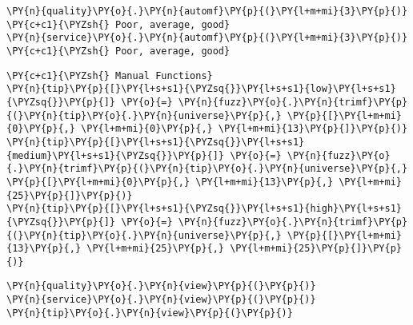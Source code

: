     \begin{tcolorbox}[breakable, size=fbox, boxrule=1pt, pad at break*=1mm,colback=cellbackground, colframe=cellborder]
\begin{Verbatim}[commandchars=\\\{\}]
\PY{n}{quality}\PY{o}{.}\PY{n}{automf}\PY{p}{(}\PY{l+m+mi}{3}\PY{p}{)} \PY{c+c1}{\PYZsh{} Poor, average, good}
\PY{n}{service}\PY{o}{.}\PY{n}{automf}\PY{p}{(}\PY{l+m+mi}{3}\PY{p}{)} \PY{c+c1}{\PYZsh{} Poor, average, good}
\end{Verbatim}
\end{tcolorbox}

    \begin{tcolorbox}[breakable, size=fbox, boxrule=1pt, pad at break*=1mm,colback=cellbackground, colframe=cellborder]
\begin{Verbatim}[commandchars=\\\{\}]
\PY{c+c1}{\PYZsh{} Manual Functions}
\PY{n}{tip}\PY{p}{[}\PY{l+s+s1}{\PYZsq{}}\PY{l+s+s1}{low}\PY{l+s+s1}{\PYZsq{}}\PY{p}{]} \PY{o}{=} \PY{n}{fuzz}\PY{o}{.}\PY{n}{trimf}\PY{p}{(}\PY{n}{tip}\PY{o}{.}\PY{n}{universe}\PY{p}{,} \PY{p}{[}\PY{l+m+mi}{0}\PY{p}{,} \PY{l+m+mi}{0}\PY{p}{,} \PY{l+m+mi}{13}\PY{p}{]}\PY{p}{)}
\PY{n}{tip}\PY{p}{[}\PY{l+s+s1}{\PYZsq{}}\PY{l+s+s1}{medium}\PY{l+s+s1}{\PYZsq{}}\PY{p}{]} \PY{o}{=} \PY{n}{fuzz}\PY{o}{.}\PY{n}{trimf}\PY{p}{(}\PY{n}{tip}\PY{o}{.}\PY{n}{universe}\PY{p}{,} \PY{p}{[}\PY{l+m+mi}{0}\PY{p}{,} \PY{l+m+mi}{13}\PY{p}{,} \PY{l+m+mi}{25}\PY{p}{]}\PY{p}{)}
\PY{n}{tip}\PY{p}{[}\PY{l+s+s1}{\PYZsq{}}\PY{l+s+s1}{high}\PY{l+s+s1}{\PYZsq{}}\PY{p}{]} \PY{o}{=} \PY{n}{fuzz}\PY{o}{.}\PY{n}{trimf}\PY{p}{(}\PY{n}{tip}\PY{o}{.}\PY{n}{universe}\PY{p}{,} \PY{p}{[}\PY{l+m+mi}{13}\PY{p}{,} \PY{l+m+mi}{25}\PY{p}{,} \PY{l+m+mi}{25}\PY{p}{]}\PY{p}{)}
\end{Verbatim}
\end{tcolorbox}

    \begin{tcolorbox}[breakable, size=fbox, boxrule=1pt, pad at break*=1mm,colback=cellbackground, colframe=cellborder]
\begin{Verbatim}[commandchars=\\\{\}]
\PY{n}{quality}\PY{o}{.}\PY{n}{view}\PY{p}{(}\PY{p}{)}
\PY{n}{service}\PY{o}{.}\PY{n}{view}\PY{p}{(}\PY{p}{)}
\PY{n}{tip}\PY{o}{.}\PY{n}{view}\PY{p}{(}\PY{p}{)}
\end{Verbatim}
\end{tcolorbox}


